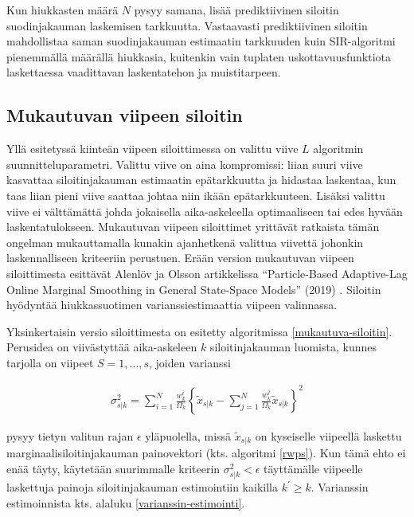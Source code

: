 \documentclass[
  12pt,
  a4paper, twoside]{book}
\begin{document}
Kun hiukkasten määrä \(N\) pysyy samana, lisää prediktiivinen siloitin suodinjakauman laskemisen tarkkuutta. Vastaavasti prediktiivinen siloitin mahdollistaa saman suodinjakauman estimaatin tarkkuuden kuin SIR-algoritmi pienemmällä määrällä hiukkasia, kuitenkin vain tuplaten uskottavuusfunktiota laskettaessa vaadittavan laskentatehon ja muistitarpeen.

\subsection{Mukautuvan viipeen siloitin}

Yllä esitetyssä kiinteän viipeen siloittimessa on valittu viive \(L\) algoritmin suunnitteluparametri. Valittu viive on aina kompromissi: liian suuri viive kasvattaa siloitinjakauman estimaatin epätarkkuutta ja hidastaa laskentaa, kun taas liian pieni viive saattaa johtaa niin ikään epätarkkuuteen. Lisäksi valittu viive ei välttämättä johda jokaisella aika-askeleella optimaaliseen tai edes hyvään laskentatulokseen. Mukautuvan viipeen siloittimet yrittävät ratkaista tämän ongelman mukauttamalla kunakin ajanhetkenä valittua viivettä johonkin laskennalliseen kriteeriin perustuen. Erään version mukautuvan viipeen siloittimesta esittävät Alenlöv ja Olsson artikkelissa ``Particle-Based Adaptive-Lag Online Marginal Smoothing in General State-Space Models'' (2019) \citep{alenlov-2019}. Siloitin hyödyntää hiukkassuotimen varianssiestimaattia viipeen valinnassa.

Yksinkertaisin versio siloittimesta on esitetty algoritmissa \ref{mukautuva-siloitin}. Perusidea on viivästyttää aika-askeleen \(k\) siloitinjakauman luomista, kunnes tarjolla on viipeet \(S=1,\ldots,s\), joiden varianssi

\begin{align}\label{siloitin-varianssi}
\sigma^2_{s|k} = \sum_{i=1}^N \frac{w_k^i}{\Omega_k}\left\{\tilde{x}_{s|k} - \sum_{j=1}^N \frac{w_k^j}{\Omega_k}\tilde{x}_{s|k} \right\}^2
\end{align}

\noindent pysyy tietyn valitun rajan \(\epsilon\) yläpuolella, missä \(\tilde{x}_{s|k}\) on kyseiselle viipeellä laskettu marginaalisiloitinjakauman painovektori (kts. algoritmi \ref{rwps}). Kun tämä ehto ei enää täyty, käytetään suurimmalle kriteerin \(\sigma^2_{s|k} < \epsilon\) täyttämälle viipeelle laskettuja painoja siloitinjakauman estimointiin kaikilla \(k^\prime \ge k\). Varianssin estimoinnista kts. alaluku \ref{varianssin-estimointi}.
\end{document}

